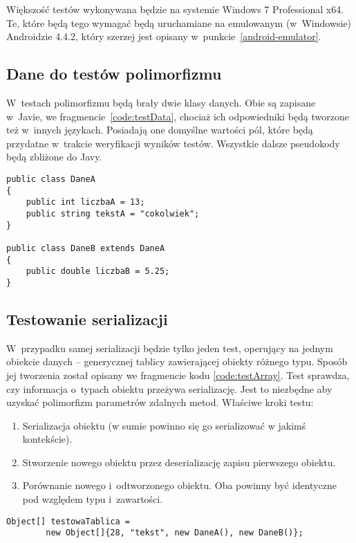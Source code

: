 Większość testów wykonywana będzie na systemie Windows 7 Professional x64.
Te, które będą tego wymagać będą uruchamiane na emulowanym (w~Windowsie) Androidzie 4.4.2, który szerzej jest opisany w~punkcie~\ref{android-emulator}.


\subsection{Dane do testów polimorfizmu}
W~testach polimorfizmu będą brały dwie klasy danych. Obie są zapisane w~Javie, we fragmencie~\ref{code:testData}, chociaż ich odpowiedniki będą tworzone też w~innych językach. Posiadają one domyślne wartości pól, które będą przydatne w~trakcie weryfikacji wyników testów. Wszystkie dalsze pseudokody będą zbliżone do Javy.

\begin{lstlisting}[float, frame=single, caption={Testowe klasy danych; jedna dziedzicząca drugą.}, label=code:testData]
public class DaneA
{
	public int liczbaA = 13;
	public string tekstA = "cokolwiek";
}

public class DaneB extends DaneA
{
	public double liczbaB = 5.25;
}
\end{lstlisting}


\subsection{Testowanie serializacji}
W~przypadku samej serializacji będzie tylko jeden test, operujący na jednym obiekcie danych -- generycznej tablicy zawierającej obiekty różnego typu.
Sposób jej tworzenia został opisany we fragmencie kodu \ref{code:testArray}.
Test sprawdza, czy informacja o~typach obiektu przeżywa serializację.
Jest to niezbędne aby uzyskać polimorfizm parametrów zdalnych metod.
Właściwe kroki testu:
\begin{enumerate}
	\item Serializacja obiektu (w sumie powinno się go serializować w jakimś kontekście).
	\item Stworzenie nowego obiektu przez deserializację zapisu pierwszego obiektu.
	\item Porównanie nowego i~odtworzonego obiektu. Oba powinny być identyczne pod względem typu i~zawartości.
\end{enumerate}

\begin{lstlisting}[frame=single, caption={Tablica obiektów różnych typów służąca do sprawdzenia, czy informacja o~typie zostaje zachowana.}, label=code:testArray]
Object[] testowaTablica =
		new Object[]{28, "tekst", new DaneA(), new DaneB()};
\end{lstlisting}

